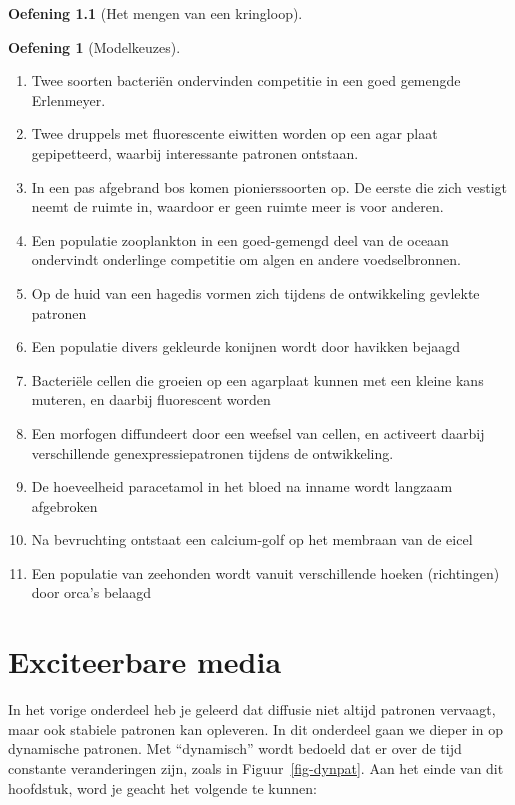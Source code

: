 \documentclass[
  a4paper,
]{scrbook}
\providecommand{\tightlist}{%
  \setlength{\itemsep}{0pt}\setlength{\parskip}{0pt}}\usepackage{longtable,booktabs,array}
\theoremstyle{definition}
\newtheorem{exercise}{Oefening}[chapter]
\theoremstyle{remark}
\begin{document}
\begin{exercise}[Het mengen van een
kringloop]
\begin{exercise}[Modelkeuzes]
\begin{enumerate}
\def\labelenumi{\alph{enumi}.}
\tightlist
\item
  Twee soorten bacteriën ondervinden competitie in een goed gemengde
  Erlenmeyer.
\item
  Twee druppels met fluorescente eiwitten worden op een agar plaat
  gepipetteerd, waarbij interessante patronen ontstaan.
\item
  In een pas afgebrand bos komen pionierssoorten op. De eerste die zich
  vestigt neemt de ruimte in, waardoor er geen ruimte meer is voor
  anderen.
\item
  Een populatie zooplankton in een goed-gemengd deel van de oceaan
  ondervindt onderlinge competitie om algen en andere voedselbronnen.
\item
  Op de huid van een hagedis vormen zich tijdens de ontwikkeling
  gevlekte patronen
\item
  Een populatie divers gekleurde konijnen wordt door havikken bejaagd
\item
  Bacteriële cellen die groeien op een agarplaat kunnen met een kleine
  kans muteren, en daarbij fluorescent worden
\item
  Een morfogen diffundeert door een weefsel van cellen, en activeert
  daarbij verschillende genexpressiepatronen tijdens de ontwikkeling.
\item
  De hoeveelheid paracetamol in het bloed na inname wordt langzaam
  afgebroken
\item
  Na bevruchting ontstaat een calcium-golf op het membraan van de eicel
\item
  Een populatie van zeehonden wordt vanuit verschillende hoeken
  (richtingen) door orca's belaagd
\end{enumerate}

\end{exercise}

\chapter{Exciteerbare media}\label{exciteerbare-media}

In het vorige onderdeel heb je geleerd dat diffusie niet altijd patronen
vervaagt, maar ook stabiele patronen kan opleveren. In dit onderdeel
gaan we dieper in op dynamische patronen. Met ``dynamisch'' wordt
bedoeld dat er over de tijd constante veranderingen zijn, zoals in
Figuur~\ref{fig-dynpat}. Aan het einde van dit hoofdstuk, word je geacht
het volgende te kunnen:


\end{exercise}
\end{document}
